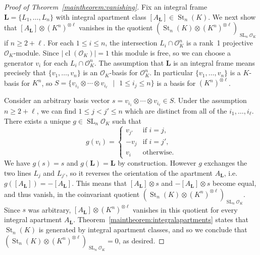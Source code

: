 \documentclass[11 pt]{article}
\theoremstyle{plain}
\theoremstyle{definition}
\numberwithin{equation}{section}
\DeclareMathOperator{\SL}{SL}
\newcommand\Set[2]{\ensuremath{\{\text{#1 $|$ #2}\}}}
\renewcommand{\O}{\mathcal{O}}
\DeclareMathOperator{\class}{cl}
\newcommand{\cl}{\class}
\DeclareMathOperator{\St}{St}
\newcommand\LL{\mathbf{L}}
\newcommand\abs[1]{\left\lvert#1\right\rvert}
\begin{document}
\begin{proof}[Proof of Theorem~\ref{maintheorem:vanishing}]
Fix an integral frame $\LL = \{L_1,\ldots,L_n\}$ with integral apartment class $[A_\LL]\in \St_n(K)$. We next show that $[A_{\LL}] \otimes (K^n)^{\otimes \ell}$ vanishes in the quotient $(\St_n(K) \otimes (K^n)^{\otimes \ell})_{\SL_n \O_K}$ if $n\geq 2+\ell$.
For each
$1 \leq i \leq n$, the intersection $L_i\cap \O_K^n$ is a rank~1 projective $\O_K$-module. Since $\abs{\cl(\O_K)}=1$ this module is free, so we can choose a generator $v_i$ for each $L_i\cap \O_K^n$. The assumption that $\LL$ is an integral frame means precisely that $\{v_1,\ldots,v_n\}$ is an $\O_K$-basis for $\O_K^n$. In particular $\{v_1,\ldots,v_n\}$ is a $K$-basis for $K^n$, so
$S = \Set{$v_{i_1} \otimes \cdots \otimes v_{i_{\ell}}$}{$1 \leq i_j \leq n$}$
is a basis for $(K^n)^{\otimes \ell}$.  %

Consider an arbitrary basis vector $s = v_{i_1} \otimes \cdots \otimes v_{i_{\ell}} \in S$. Under the assumption $n\geq 2+\ell$,  we can find $1 \leq j < j' \leq n$ which
are distinct from all of the $i_1,\ldots,i_{\ell}$.  There exists a unique $g \in \SL_n \O_K$ such that 
\[g(v_i) = \begin{cases}
v_{j'} & \text{if $i = j$},\\
-v_{j} & \text{if $i = j'$},\\
v_i    & \text{otherwise}.\end{cases}\]
We have $g(s) = s$ and $g(\LL)=\LL$ by construction.
However $g$ exchanges the two lines $L_j$ and $L_{j'}$, so it reverses the orientation of the apartment $A_{\LL}$, i.e.\ $g([A_{\LL}]) = -[A_{\LL}]$. This means that $[A_{\LL}] \otimes s$ and $-[A_{\LL}] \otimes s$ become equal, and thus vanish, in the coinvariant quotient $(\St_n(K) \otimes (K^n)^{\otimes \ell})_{\SL_n \O_K}$. Since $s$ was arbitrary, $[A_{\LL}] \otimes (K^n)^{\otimes \ell}$ vanishes in this quotient for every integral apartment $A_{\LL}$. Theorem~\ref{maintheorem:integralapartments} states that $\St_n(K)$ is generated
by integral apartment classes, and so we conclude that $(\St_n(K) \otimes (K^n)^{\otimes \ell})_{\SL_n \O_K}=0$, as desired.
\end{proof}
\end{document}
